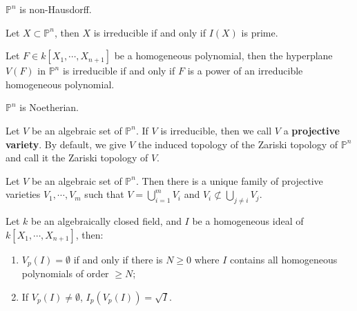 \documentclass{note-eng}
\begin{document}
\begin{corollary}
    $\mathbb{P}^n$ is non-Hausdorff.
\end{corollary}

\begin{proposition}
    Let $X \subset \mathbb{P}^n$, then $X$ is irreducible if and only if $I(X)$ is prime.
\end{proposition}

\begin{corollary}
    Let $F \in k[X_1, \cdots, X_{n + 1}]$ be a homogeneous polynomial, then the hyperplane $V(F)$ in $\mathbb{P}^n$ is irreducible if and only if $F$ is a power of an irreducible homogeneous polynomial.
\end{corollary}

\begin{proposition}
    $\mathbb{P}^n$ is Noetherian.
\end{proposition}

\begin{definition}
    Let $V$ be an algebraic set of $\mathbb{P}^n$. If $V$ is irreducible, then we call $V$ a \textbf{projective variety}. By default, we give $V$ the induced topology of the Zariski topology of $\mathbb{P}^n$ and call it the Zariski topology of $V$.
\end{definition}

\begin{proposition}
    Let $V$ be an algebraic set of $\mathbb{P}^n$. Then there is a unique family of projective varieties $V_1, \cdots, V_m$ such that $V = \bigcup\limits_{i = 1}^{m} V_i$ and $V_i \not \subset \bigcup\limits_{j \ne i} V_j$.
\end{proposition}

\begin{proposition}
    Let $k$ be an algebraically closed field, and $I$ be a homogeneous ideal of $k[X_1, \cdots, X_{n + 1}]$, then:
    \begin{enumerate}
        \item $V_p(I) = \emptyset$ if and only if there is $N \ge 0$ where $I$ contains all homogeneous polynomials of order $\ge N$;
        \item If $V_p(I) \ne \emptyset$, $I_p(V_p(I)) = \sqrt{I}$.
    \end{enumerate}
\end{proposition}
\end{document}
